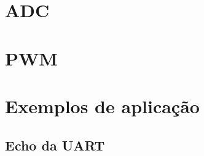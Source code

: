 \documentclass[a4paper,10pt,oneside]{book}
\begin{document}
\chapter{ADC}


\chapter{PWM}


\chapter{Exemplos de aplicação}

\section{Echo da UART}





\end{document}
